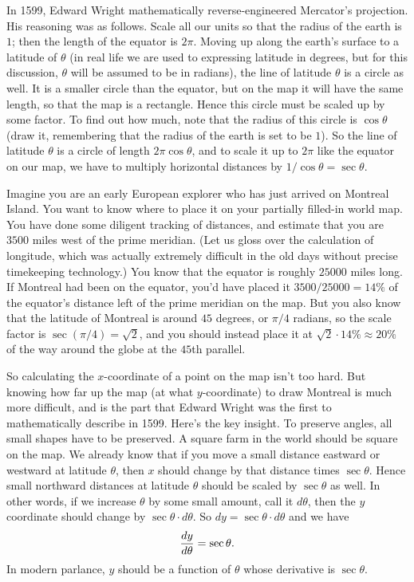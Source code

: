 In 1599, Edward Wright mathematically reverse-engineered Mercator's projection. His reasoning was as
follows. Scale all our units so that the radius of the earth is $1$; then the length of the equator is
$2\pi$. Moving up along the earth's surface to a latitude of $\theta$ (in real life we are used
to expressing latitude in degrees, but for this discussion, $\theta$ will be assumed to be in radians),
the line of latitude $\theta$ is a circle as well. It is a smaller circle than the equator, but on
the map it will have the same length, so that the map is a rectangle. Hence this circle must be scaled
up by some factor. To find out how much, note that the radius of this circle is $\cos \theta$ (draw it,
remembering that the radius of the earth is set to be $1$). So the line of latitude $\theta$ is a circle
of length $2\pi\cos\theta$, and to scale it up to $2\pi$ like the equator on our map, we have to multiply
horizontal distances by $1/\cos\theta = \sec\theta$.

Imagine you are an early European explorer who has just arrived on Montreal Island. You want to know where
to place it on your partially filled-in world map. You have done some diligent tracking of distances,
and estimate that you are $3500$ miles west of the prime meridian. (Let us gloss over the calculation
of longitude, which was actually extremely difficult in the old days without precise timekeeping technology.)
You know that the equator is roughly $25000$
miles long. If Montreal had been on the equator, you'd have placed it $3500/25000 = 14\%$ of the equator's
distance left of the prime meridian on the map. But you also know that the latitude of Montreal is around
$45$ degrees, or $\pi/4$ radians, so the scale factor is $\sec(\pi/4) = \sqrt 2$, and you should instead
place it at $\sqrt 2\cdot 14\% \approx 20\%$ of the way around the globe at the $45$th parallel.

So calculating the $x$-coordinate of a point on the map isn't too hard.
But knowing how far up the map (at what $y$-coordinate) to draw Montreal is much more difficult,
and is the part that Edward Wright was the first to mathematically describe in 1599.
Here's the key insight. To preserve angles, all small shapes have to be preserved. A square farm in the world
should be square on the map. We already know that if you move a small distance eastward or westward at
latitude $\theta$, then $x$ should change by that distance times $\sec\theta$.
Hence small northward distances at latitude $\theta$ should be scaled by $\sec\theta$
as well. In other words, if we increase $\theta$ by some small amount, call it $d\theta$, then the
$y$ coordinate should change by $\sec\theta\cdot d\theta$. So $dy = \sec\theta\cdot d\theta$ and we have
$${dy\over d\theta} = \sec\theta.$$
In modern parlance, $y$ should be a function of $\theta$ whose derivative is $\sec\theta$.

